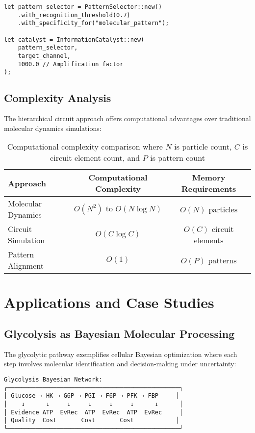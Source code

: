 \documentclass[12pt,a4paper]{article}
\begin{document}
\begin{verbatim}
let pattern_selector = PatternSelector::new()
    .with_recognition_threshold(0.7)
    .with_specificity_for("molecular_pattern");

let catalyst = InformationCatalyst::new(
    pattern_selector, 
    target_channel, 
    1000.0 // Amplification factor
);
\end{verbatim}

\subsection{Complexity Analysis}

The hierarchical circuit approach offers computational advantages over traditional molecular dynamics simulations:

\begin{table}[H]
\centering
\begin{tabular}{lcc}
\toprule
Approach & Computational Complexity & Memory Requirements \\
\midrule
Molecular Dynamics & $O(N^2)$ to $O(N \log N)$ & $O(N)$ particles \\
Circuit Simulation & $O(C \log C)$ & $O(C)$ circuit elements \\
Pattern Alignment & $O(1)$ & $O(P)$ patterns \\
\bottomrule
\end{tabular}
\caption{Computational complexity comparison where $N$ is particle count, $C$ is circuit element count, and $P$ is pattern count}
\end{table}

\section{Applications and Case Studies}

\subsection{Glycolysis as Bayesian Molecular Processing}

The glycolytic pathway exemplifies cellular Bayesian optimization where each step involves molecular identification and decision-making under uncertainty:

\begin{verbatim}
Glycolysis Bayesian Network:
┌─────────────────────────────────────────────────┐
│ Glucose → HK → G6P → PGI → F6P → PFK → FBP     │
│    ↓      ↓     ↓     ↓     ↓     ↓      ↓      │
│ Evidence ATP  EvRec  ATP  EvRec  ATP  EvRec     │
│ Quality  Cost       Cost       Cost            │
└─────────────────────────────────────────────────┘
\end{verbatim}
\end{document}
